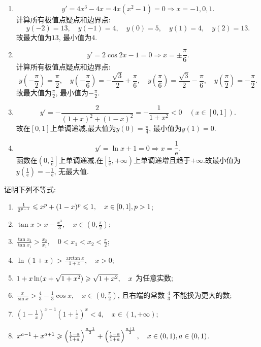\begin{solution}
    \begin{enumerate}
        \item $$y' = 4x^3 - 4x = 4x(x^2 - 1) = 0 \Rightarrow x = -1, 0, 1.$$
              计算所有极值点疑点和边界点:
              $$
                  y(-2) = 13, \quad y(-1) = 4, \quad y(0) = 5, \quad y(1) = 4, \quad y(2) = 13.
              $$
              故最大值为$13$, 最小值为$4$.
        \item $$y' = 2\cos 2x - 1 = 0 \Rightarrow x = \pm \frac{\pi}{6}.$$
              计算所有极值点疑点和边界点:
              $$
                  y\left(-\frac{\pi}{2}\right) = \frac{\pi}{2}, \quad y\left(-\frac{\pi}{6}\right) = -\frac{\sqrt{3}}{2} + \frac{\pi}{6}, \quad y\left(\frac{\pi}{6}\right) = \frac{\sqrt{3}}{2} - \frac{\pi}{6}, \quad y\left(\frac{\pi}{2}\right) = -\frac{\pi}{2}.
              $$
              故最大值为$\frac{\pi}{2}$, 最小值为$-\frac{\pi}{2}$.
        \item $$y' = -\frac{2}{(1+x)^2 + (1-x)^2} = -\frac{1}{1+x^2} < 0 \quad (x \in [0,1]).$$
              故在$[0,1]$上单调递减,最大值为$y(0) = \frac{\pi}{4}$, 最小值为$y(1) = 0$.
        \item $$y' = \ln x + 1 = 0 \Rightarrow x = \frac{1}{\mathrm{e}}.$$
              函数在$\left(0, \frac{1}{\mathrm{e}}\right]$上单调递减,在$\left[\frac{1}{\mathrm{e}}, +\infty\right)$上单调递增且趋于$+\infty$.故最小值为$y\left(\frac{1}{\mathrm{e}}\right) = -\frac{1}{\mathrm{e}}$, 无最大值.
    \end{enumerate}
\end{solution}

\begin{exercise}[3.3.23]
    证明下列不等式:
    \begin{enumerate}
        \item $\frac{1}{2^{p-1}} \leqslant x^p+(1-x)^p \leqslant 1, \quad x \in [0,1], p>1$;
        \item $\tan x > x - \frac{x^3}{3}, \quad x \in (0, \frac{\pi}{2})$;
        \item $\frac{\tan x_2}{\tan x_1} > \frac{x_2}{x_1}, \quad 0<x_1<x_2<\frac{\pi}{2}$;
        \item $\ln(1+x) > \frac{\arctan x}{1+x}, \quad x>0$;
        \item $1+x\ln(x+\sqrt{1+x^2}) \geqslant \sqrt{1+x^2}, \quad x$ 为任意实数;
        \item $\frac{x}{\sin x} > \frac{4}{3} - \frac{1}{3}\cos x, \quad x \in (0, \frac{\pi}{2})$, 且右端的常数 $\frac{4}{3}$ 不能换为更大的数;
        \item $(1-\frac{1}{x})^{x-1} (1+\frac{1}{x})^x < 4, \quad x \in (1, +\infty)$;
        \item $x^{a-1}+x^{a+1} \geqslant \left(\frac{1-a}{1+a}\right)^{\frac{a-1}{2}} + \left(\frac{1-a}{1+a}\right)^{\frac{a+1}{2}}, \quad x \in (0,1), a \in (0,1)$.
    \end{enumerate}
\end{exercise}

